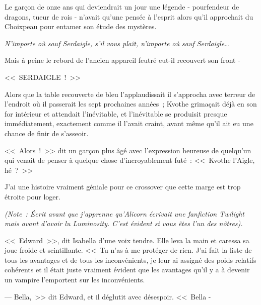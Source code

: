 
Le garçon de onze ans qui deviendrait un jour une légende - pourfendeur de dragons, tueur de rois - n'avait qu'une pensée à l'esprit alors qu'il approchait du Choixpeau pour entamer son étude des mystères.

\emph{N'importe où sauf Serdaigle, s'il vous plaît, n'importe où sauf Serdaigle…}

Mais à peine le rebord de l'ancien appareil feutré eut-il recouvert son front -

<<~SERDAIGLE~!~>>

Alors que la table recouverte de bleu l'applaudissait il s'approcha avec terreur de l'endroit où il passerait les sept prochaines années~; Kvothe grimaçait déjà en son for intérieur et attendait l'inévitable, et l'inévitable se produisit presque immédiatement, exactement comme il l'avait craint, avant même qu'il ait eu une chance de finir de s'asseoir.

<<~Alors~!~>> dit un garçon plus âgé avec l'expression heureuse de quelqu'un qui venait de penser à quelque chose d'incroyablement futé~: <<~Kvothe l'Aigle, hé~?~>> \footnotemark{}


J'ai une histoire vraiment géniale pour ce crossover que cette marge est trop étroite pour loger.


\emph{(Note~: Écrit avant que j'apprenne qu'Alicorn écrivait une fanfiction Twilight mais avant d'avoir lu {Luminosity}. C'est évident si vous êtes l'un des nôtres).}

<<~Edward~>>, dit Isabella d'une voix tendre. Elle leva la main et caressa sa joue froide et scintillante. <<~Tu n'as à me protéger de rien. J'ai fait la liste de tous les avantages et de tous les inconvénients, je leur ai assigné des poids relatifs cohérents et il était juste vraiment évident que les avantages qu'il y a à devenir un vampire l'emportent sur les inconvénients.

--- Bella,~>> dit Edward, et il déglutit avec désespoir. <<~Bella -


